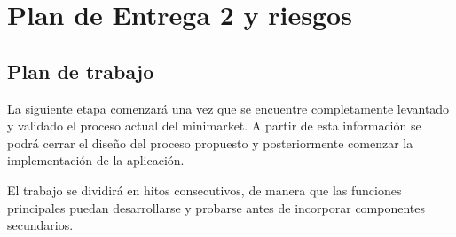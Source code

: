 \documentclass[10pt,a4paper]{article}
\begin{document}
\section{Plan de Entrega 2 y riesgos}

\subsection{Plan de trabajo}

La siguiente etapa comenzará una vez que se encuentre completamente levantado y validado el proceso actual del minimarket. A partir de esta información se podrá cerrar el diseño del proceso propuesto y posteriormente comenzar la implementación de la aplicación.

El trabajo se dividirá en hitos consecutivos, de manera que las funciones principales puedan desarrollarse y probarse antes de incorporar componentes secundarios.
\end{document}
